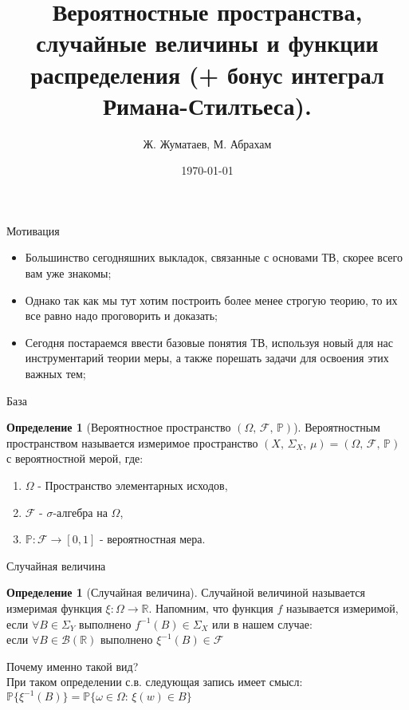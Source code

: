 \documentclass{beamer}%
\title{Вероятностные пространства, случайные величины и функции распределения (+ бонус интеграл Римана-Стилтьеса).}
\author[Ж. Жуматаев, М. Абрахам]{Ж. Жуматаев, М. Абрахам}
\institute[Клуб теории вероятностей]{Клуб теории вероятностей ФЭН ВШЭ}
\date{\today}
\theoremstyle{definition}
\newtheorem{mydef}[theorem]{Определение}
\begin{document}
\begin{frame}
\titlepage
\end{frame}


\begin{frame}{Мотивация}
\begin{itemize}
    \item Большинство сегодняшних выкладок, связанные с основами ТВ, скорее всего вам уже знакомы;
    \item Однако так как мы тут хотим построить более менее строгую теорию, то их все равно надо проговорить и доказать;
    \item Сегодня постараемся ввести базовые понятия ТВ, используя новый для нас инструментарий теории меры, а также порешать задачи для освоения этих важных тем;
\end{itemize}

\end{frame}


\begin{frame}{База}
    
    \begin{mydef}[Вероятностное пространство $(\Omega,\,\mathcal{F},\,\mathbb{P})$]
    Вероятностным пространством называется измеримое пространство $(X,\, \Sigma_X,\, \mu) = (\Omega,\, \mathcal{F},\, \mathbb{P})$ с вероятностной мерой, где:
    \begin{enumerate}
        \item $\Omega$ - Пространство элементарных исходов,
        \item $\mathcal{F}$ - $\sigma$-алгебра на $\Omega$,
        \item $\mathbb{P}: \mathcal{F}\to [0,1]$ - вероятностная мера.
    \end{enumerate}
    \end{mydef}
    
\end{frame}

\begin{frame}{Случайная величина}
    
    \begin{mydef}[Случайная величина]
    Случайной величиной называется измеримая функция $\xi: \Omega \to \mathbb{R}$.
    Напомним, что функция $f$ называется измеримой, \\
    если $\forall B \in \Sigma_Y$ выполнено $f^{-1}(B) \in \Sigma_X$ или в нашем случае:\\
    если $\forall B \in \mathcal{B}(\mathbb{R})$ выполнено $\xi^{-1}(B) \in \mathcal{F}$
    \end{mydef}
    Почему именно такой вид?\\
    При таком определении с.в. следующая запись имеет смысл:
    $\mathbb{P}\{\xi^{-1}(B)\} = \mathbb{P}\{\omega \in \Omega:\, \xi(w) \in B\}$
    
\end{frame}
\end{document}
